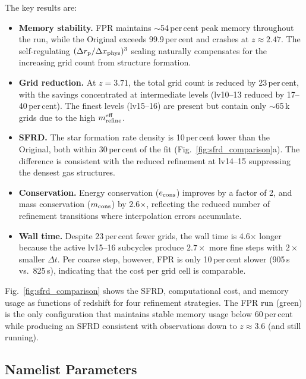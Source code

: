 \documentclass[fleqn,usenatbib]{mnras}
\newcommand{\drp}{\Delta r_{\rm p}}
\newcommand{\dxp}{\Delta x_{\rm phys}}
\begin{document}
The key results are:
\begin{itemize}
  \item \textbf{Memory stability.}  FPR maintains $\sim$54\,per\,cent
    peak memory throughout the run, while the Original exceeds
    99.9\,per\,cent and crashes at $z\approx2.47$.  The self-regulating
    $({\drp}/{\dxp})^3$ scaling naturally compensates for the increasing
    grid count from structure formation.

  \item \textbf{Grid reduction.}  At $z=3.71$, the total grid count is
    reduced by 23\,per\,cent, with the savings concentrated at
    intermediate levels (lv10--13 reduced by 17--40\,per\,cent).  The
    finest levels (lv15--16) are present but contain only $\sim$65\,k
    grids due to the high $m_{\rm refine}^{\rm eff}$.

  \item \textbf{SFRD.}  The star formation rate density is 10\,per\,cent
    lower than the Original, both within 30\,per\,cent of the
    \citet{MadauDickinson2014} fit (Fig.~\ref{fig:sfrd_comparison}a).
    The difference is consistent with the reduced refinement at
    lv14--15 suppressing the densest gas structures.

  \item \textbf{Conservation.}  Energy conservation ($e_{\rm cons}$)
    improves by a factor of 2, and mass conservation ($m_{\rm cons}$)
    by 2.6$\times$, reflecting the reduced number of refinement
    transitions where interpolation errors accumulate.

  \item \textbf{Wall time.}  Despite 23\,per\,cent fewer grids, the
    wall time is 4.6$\times$ longer because the active lv15--16
    subcycles produce $2.7\times$ more fine steps with $2\times$
    smaller $\Delta t$.  Per coarse step, however, FPR is only
    10\,per\,cent slower (905\,s vs.\ 825\,s), indicating that the cost
    per grid cell is comparable.
\end{itemize}

Fig.~\ref{fig:sfrd_comparison} shows the SFRD, computational cost,
and memory usage as functions of redshift for four refinement
strategies.  The FPR run (green) is the only configuration that
maintains stable memory usage below 60\,per\,cent while producing an
SFRD consistent with observations down to $z\approx3.6$ (and still
running).

\subsection{Namelist Parameters}
\label{sec:fpr_params}
\end{document}
